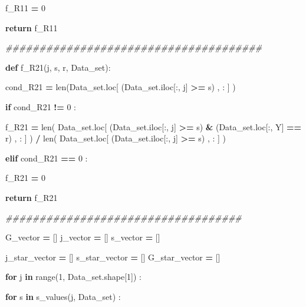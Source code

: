 \documentclass[
  11pt,
  a4paper,
]{article}
\newenvironment{Shaded}{\begin{snugshade}}{\end{snugshade}}
\newcommand{\BuiltInTok}[1]{#1}
\newcommand{\CommentTok}[1]{\textcolor[rgb]{0.56,0.35,0.01}{\textit{#1}}}
\newcommand{\ControlFlowTok}[1]{\textcolor[rgb]{0.13,0.29,0.53}{\textbf{#1}}}
\newcommand{\DecValTok}[1]{\textcolor[rgb]{0.00,0.00,0.81}{#1}}
\newcommand{\KeywordTok}[1]{\textcolor[rgb]{0.13,0.29,0.53}{\textbf{#1}}}
\newcommand{\NormalTok}[1]{#1}
\newcommand{\OperatorTok}[1]{\textcolor[rgb]{0.81,0.36,0.00}{\textbf{#1}}}
\newcommand{\StringTok}[1]{\textcolor[rgb]{0.31,0.60,0.02}{#1}}
\begin{document}
\begin{Shaded}
\begin{Highlighting}[]
\NormalTok{                f\_R11 }\OperatorTok{=} \DecValTok{0}

            
            \ControlFlowTok{return}\NormalTok{ f\_R11 }

        \CommentTok{\#\#\#\#\#\#\#\#\#\#\#\#\#\#\#\#\#\#\#\#\#\#\#\#\#\#\#\#\#\#\#\#\#\#\#\#\#\#}

        \KeywordTok{def}\NormalTok{ f\_R21(j, s, r, Data\_set):}

\NormalTok{            cond\_R21 }\OperatorTok{=} \BuiltInTok{len}\NormalTok{(Data\_set.loc[ (Data\_set.iloc[:, j] }\OperatorTok{\textgreater{}=}\NormalTok{ s) , : ] )}

            \ControlFlowTok{if}\NormalTok{ cond\_R21 }\OperatorTok{!=} \DecValTok{0}\NormalTok{ :}

\NormalTok{                f\_R21 }\OperatorTok{=} \BuiltInTok{len}\NormalTok{( Data\_set.loc[ (Data\_set.iloc[:, j] }\OperatorTok{\textgreater{}=}\NormalTok{ s) }\OperatorTok{\&}\NormalTok{ (Data\_set.loc[:, }\StringTok{\textquotesingle{}Y\textquotesingle{}}\NormalTok{] }\OperatorTok{==}\NormalTok{ r) , : ] ) }\OperatorTok{/} \BuiltInTok{len}\NormalTok{( Data\_set.loc[ (Data\_set.iloc[:, j] }\OperatorTok{\textgreater{}=}\NormalTok{ s) , : ] )}
            
            \ControlFlowTok{elif}\NormalTok{ cond\_R21 }\OperatorTok{==} \DecValTok{0}\NormalTok{ :}

\NormalTok{                f\_R21 }\OperatorTok{=} \DecValTok{0}

            
            \ControlFlowTok{return}\NormalTok{ f\_R21 }


        \CommentTok{\#\#\#\#\#\#\#\#\#\#\#\#\#\#\#\#\#\#\#\#\#\#\#\#\#\#\#\#\#\#\#\#\#\#\#}

\NormalTok{        G\_vector }\OperatorTok{=}\NormalTok{ []}
\NormalTok{        j\_vector }\OperatorTok{=}\NormalTok{ []}
\NormalTok{        s\_vector }\OperatorTok{=}\NormalTok{ []}

\NormalTok{        j\_star\_vector }\OperatorTok{=}\NormalTok{ []}
\NormalTok{        s\_star\_vector }\OperatorTok{=}\NormalTok{ []}
\NormalTok{        G\_star\_vector }\OperatorTok{=}\NormalTok{ []}

        \ControlFlowTok{for}\NormalTok{ j }\KeywordTok{in} \BuiltInTok{range}\NormalTok{(}\DecValTok{1}\NormalTok{, Data\_set.shape[}\DecValTok{1}\NormalTok{]) :}

            \ControlFlowTok{for}\NormalTok{ s }\KeywordTok{in}\NormalTok{ s\_values(j, Data\_set) :}



\end{Highlighting}
\end{Shaded}
\end{document}
